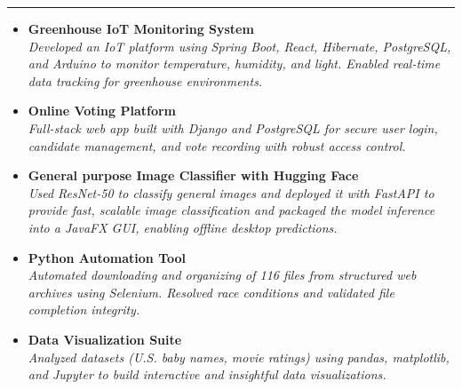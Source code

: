 \documentclass{article}
\newcommand{\resumesection}[1]{
  \vspace{1.2ex}
  \noindent{\Large\textbf{\MakeUppercase{#1}}}
  \vspace{0.4ex}
  \hrule height 0.3pt
  \vspace{0.8ex}
}
\newcommand{\resumesubentry}[2]{
  \item[] \textbf{#1} \\
  \textit{#2} \\
}
\begin{document}
\resumesection{Selected Projects}
\begin{itemize}[leftmargin=*,label={}]
    \resumesubentry{Greenhouse IoT Monitoring System}{
      Developed an IoT platform using Spring Boot, React, Hibernate, PostgreSQL, and Arduino to 
      monitor temperature, humidity, and light. Enabled real-time data tracking for greenhouse environments.
    }

    \resumesubentry{Online Voting Platform}{
      Full-stack web app built with Django and PostgreSQL for secure user login, candidate management,
       and vote recording with robust access control.
    }

    \resumesubentry{General purpose Image Classifier with Hugging Face}{
      Used ResNet-50 to classify general images and deployed it with FastAPI to provide fast,
       scalable image classification and packaged the model inference into a JavaFX GUI, enabling offline desktop predictions.
    }

    \resumesubentry{Python Automation Tool}{
      Automated downloading and organizing of 116 files from structured web archives using Selenium.
       Resolved race conditions and validated file completion integrity.
    }

    \resumesubentry{Data Visualization Suite}{
      Analyzed datasets (U.S. baby names, movie ratings) using pandas, matplotlib, and Jupyter 
      to build interactive and insightful data visualizations.
    }
\end{itemize}
\end{document}
